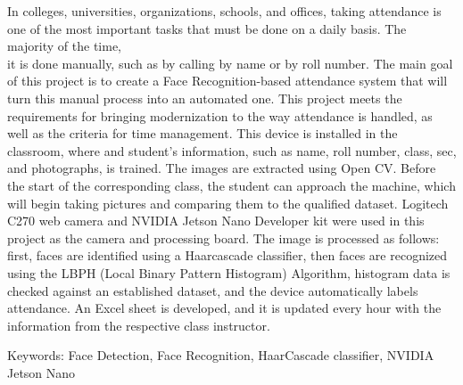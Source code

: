 \begin{center}
In colleges, universities, organizations, schools, and offices, taking attendance is one of the most important tasks that must be done on a daily basis. The majority of the time,\\
it is done manually, such as by calling by name or by roll number. The main goal of this project is to create a Face Recognition-based attendance system that will turn this manual process into an automated one. This project meets the requirements for bringing modernization to the way attendance is handled, as well as the criteria for time management. This device is installed in the classroom, where and student's information, such as name, roll number, class, sec, and photographs, is trained. The images are extracted using Open CV. Before the start of the corresponding class, the student can approach the machine, which will begin taking pictures and comparing them to the qualified dataset. Logitech C270 web camera and NVIDIA Jetson Nano Developer kit were used in this project as the camera and processing board. The image is processed as follows: first, faces are identified using a Haarcascade classifier, then faces are recognized using the LBPH (Local Binary Pattern Histogram) Algorithm, histogram data is checked against an established dataset, and the device automatically labels attendance. An Excel sheet is developed, and it is updated every hour with the information from the respective class instructor. 
 
Keywords: Face Detection, Face Recognition, HaarCascade classifier, NVIDIA Jetson Nano 

\\[2.0cm]

\end{center}
\normalsize 



